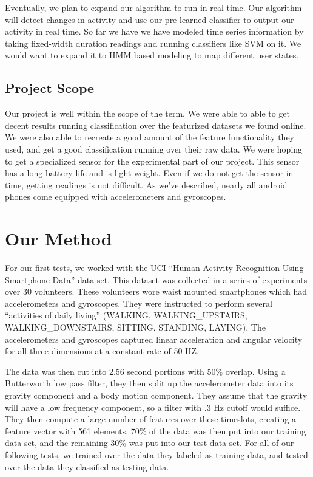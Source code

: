 \documentclass{article} %
\begin{document}
Eventually, we plan to expand our algorithm to run in real time. Our algorithm will detect changes in activity and use our pre-learned classifier to output our activity in real time. So far we have we have modeled time series information by taking fixed-width duration readings and running classifiers like SVM on it. We would want to expand it to HMM based modeling to map different user states.

\subsection{Project Scope}
Our project is well within the scope of the term. We were able to able to get decent results running classification over the featurized datasets we found online. We were also able to recreate a good amount of the feature functionality they used, and get a good classification running over their raw data. We were hoping to get a specialized sensor for the experimental part of our project. This sensor has a long battery life and is light weight. Even if we do not get the sensor in time, getting readings is not difficult. As we’ve described, nearly all android phones come equipped with accelerometers and gyroscopes.  

\section{Our Method}
For our first tests, we worked with the UCI “Human Activity Recognition Using Smartphone Data” data set. This dataset was collected in a series of experiments over 30 volunteers. These volunteers wore waist mounted smartphones which had accelerometers and gyroscopes. They were instructed to perform several “activities of daily living” (WALKING, WALKING\_UPSTAIRS, WALKING\_DOWNSTAIRS, SITTING, STANDING, LAYING). The accelerometers and gyroscopes captured linear acceleration and angular velocity for all three dimensions at a constant rate of 50 HZ. 

The data was then cut into 2.56 second portions with 50\% overlap. Using a Butterworth low pass filter, they then split up the accelerometer data into its gravity component and a body motion component. They assume that the gravity will have a low frequency component, so a filter with .3 Hz cutoff would suffice. They then compute a large number of features over these timeslots, creating a feature vector with 561 elements. 70\% of the data was then put into our training data set, and the remaining 30\% was put into our test data set. For all of our following tests, we trained over the data they labeled as training data, and tested over the data they classified as testing data.
\end{document}

